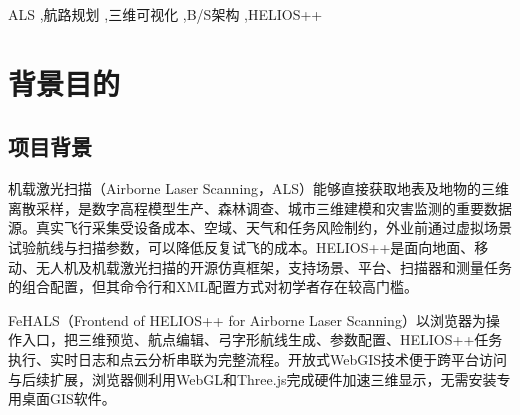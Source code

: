 \documentclass[a4paper,fleqn]{cas-sc}
\begin{document}
\begin{abstract}
  机载激光扫描（Airborne Laser Scanning, ALS）能够直接获取地表及地物的三维离散采样，是数字高程模型生产、森林调查、城市三维建模和灾害监测的重要数据源。真实飞行采集受设备成本、空域、天气和任务风险制约，外业前通过虚拟场景试验航线与扫描参数，可以降低反复试飞的成本。HELIOS++是面向地面、移动、无人机及机载激光扫描的开源仿真框架，支持场景、平台、扫描器和测量任务的组合配置，但其命令行和XML配置方式对初学者存在较高门槛。FeHALS（Frontend of HELIOS++ for Airborne Laser Scanning）以浏览器为操作入口，把三维预览、航点编辑、弓字形航线生成、参数配置、HELIOS++任务执行、实时日志和点云分析串联为完整流程。开放式WebGIS技术便于跨平台访问与后续扩展，浏览器侧利用WebGL和Three.js完成硬件加速三维显示，无需安装专用桌面GIS软件。
\end{abstract}

\begin{keywords}
  ALS \sep 航路规划 \sep 三维可视化 \sep B/S架构 \sep HELIOS++
\end{keywords}

\MakeNJFUTitlePage[UseDocTitle]
\maketitle
\tableofcontents
\hrulefill

\section{背景目的}

\subsection{项目背景}

机载激光扫描（Airborne Laser Scanning，ALS）能够直接获取地表及地物的三维离散采样，是数字高程模型生产、森林调查、城市三维建模和灾害监测的重要数据源。真实飞行采集受设备成本、空域、天气和任务风险制约，外业前通过虚拟场景试验航线与扫描参数，可以降低反复试飞的成本。HELIOS++是面向地面、移动、无人机及机载激光扫描的开源仿真框架，支持场景、平台、扫描器和测量任务的组合配置\citep{heliosPlusPlus}，但其命令行和XML配置方式对初学者存在较高门槛。

FeHALS（Frontend of HELIOS++ for Airborne Laser Scanning）以浏览器为操作入口，把三维预览、航点编辑、弓字形航线生成、参数配置、HELIOS++任务执行、实时日志和点云分析串联为完整流程。开放式WebGIS技术便于跨平台访问与后续扩展\citep{opengis,viswebdrone,lidarWebgis}，浏览器侧利用WebGL和Three.js完成硬件加速三维显示，无需安装专用桌面GIS软件。
\end{document}
